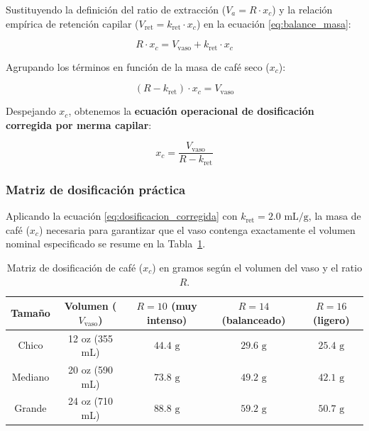 \documentclass{article}
\begin{document}
Sustituyendo la definición del ratio de extracción ($V_a = R \cdot x_c$) y la relación empírica de retención capilar ($V_{\text{ret}} = k_{\text{ret}} \cdot x_c$) en la ecuación \ref{eq:balance_masa}:

\begin{equation}
	R \cdot x_c = V_{\text{vaso}} + k_{\text{ret}} \cdot x_c
\end{equation}

Agrupando los términos en función de la masa de café seco ($x_c$):

\begin{equation}
	(R - k_{\text{ret}}) \cdot x_c = V_{\text{vaso}}
\end{equation}

Despejando $x_c$, obtenemos la \textbf{ecuación operacional de dosificación corregida por merma capilar}:

\begin{equation}
	x_c = \frac{V_{\text{vaso}}}{R - k_{\text{ret}}} \label{eq:dosificacion_corregida}
\end{equation}

\subsubsection{Matriz de dosificación práctica}

Aplicando la ecuación \ref{eq:dosificacion_corregida} con $k_{\text{ret}} = 2.0\text{ mL/g}$, la masa de café ($x_c$) necesaria para garantizar que el vaso contenga exactamente el volumen nominal especificado se resume en la Tabla~\ref{tab:dosificacion_vasos}.

\begin{table}[H]
	\centering
	\caption{Matriz de dosificación de café ($x_c$) en gramos según el volumen del vaso y el ratio $R$.}
	\label{tab:dosificacion_vasos}
	\vspace{6pt}
	\begin{tabular}{ccccc}
		\toprule
		\textbf{Tamaño} & \textbf{Volumen ($V_{\text{vaso}}$)} & \textbf{$R = 10$ (muy intenso)} & \textbf{$R = 14$ (balanceado)} & \textbf{$R = 16$ (ligero)} \\
		\midrule
		Chico & 12 oz (355 mL) & $44.4\text{ g}$ & $29.6\text{ g}$ & $25.4\text{ g}$ \\
		Mediano & 20 oz (590 mL) & $73.8\text{ g}$ & $49.2\text{ g}$ & $42.1\text{ g}$ \\
		Grande & 24 oz (710 mL) & $88.8\text{ g}$ & $59.2\text{ g}$ & $50.7\text{ g}$ \\
		\bottomrule
	\end{tabular}
\end{table}
\end{document}
